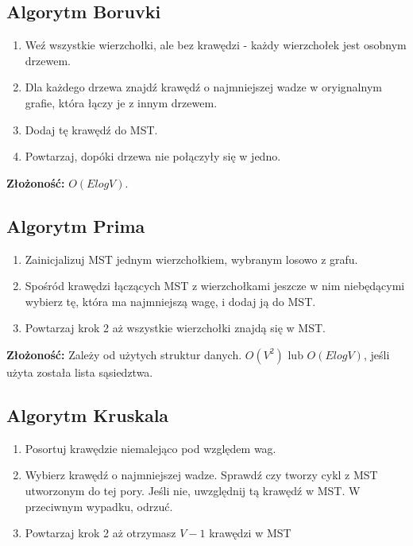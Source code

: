 \documentclass[main.tex]{subfiles}
\begin{document}
    \subsection{Algorytm Boruvki}
    \begin{enumerate}
        \item Weź wszystkie wierzchołki, ale bez krawędzi - każdy wierzchołek jest osobnym drzewem.
        \item Dla każdego drzewa znajdź krawędź o najmniejszej wadze w oryignalnym grafie, która łączy je z innym drzewem.
        \item Dodaj tę krawędź do MST.
        \item Powtarzaj, dopóki drzewa nie połączyły się w jedno.
    \end{enumerate}
    \textbf{Złożoność:} $O(ElogV)$.


    \subsection{Algorytm Prima}
    \begin{enumerate}
        \item Zainicjalizuj MST jednym wierzchołkiem, wybranym losowo z grafu.
        \item Spośród krawędzi łączących MST z wierzchołkami jeszcze w nim niebędącymi wybierz tę, która ma najmniejszą wagę, i dodaj ją do MST.
        \item Powtarzaj krok 2 aż wszystkie wierzchołki znajdą się w MST.
    \end{enumerate}
    \textbf{Złożoność:} Zależy od użytych struktur danych. $O(V^2)$ lub $O(ElogV)$, jeśli użyta została lista sąsiedztwa.



    \subsection{Algorytm Kruskala}

    \begin{enumerate}
        \item Posortuj krawędzie niemalejąco pod względem wag.
        \item Wybierz krawędź o najmniejszej wadze. Sprawdź czy tworzy cykl z MST utworzonym do tej pory. Jeśli nie, uwzględnij tą krawędź w MST. W przeciwnym wypadku, odrzuć.
        \item Powtarzaj krok 2 aż otrzymasz $V-1$ krawędzi w MST
    \end{enumerate}
\end{document}
